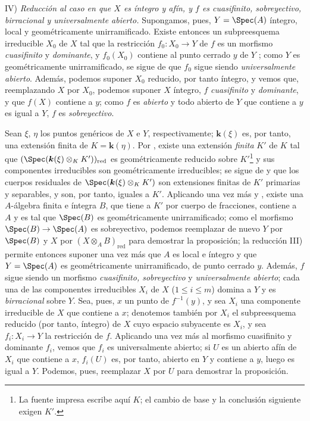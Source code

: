 IV) \emph{Reducción al caso en que $X$ es íntegro y afín, y $f$ es cuasifinito, sobreyectivo, birracional y universalmente abierto.}
Supongamos, pues, $Y=\Spec(A)$ íntegro, local y geométricamente unirramificado.
Existe entonces un subpreesquema irreducible $X_0$ de $X$ tal que la restricción $f_0:X_0\to Y$ de $f$ es un morfismo \emph{cuasifinito} y \emph{dominante}, y $f_0(X_0)$ contiene al punto cerrado $y$ de $Y$ ; como $Y$ es geométricamente unirramificado, se sigue de  que $f_0$ sigue siendo \emph{universalmente abierto}.
Además, podemos suponer $X_0$ reducido, por tanto íntegro, y vemos que, reemplazando $X$ por $X_0$, podemos suponer $X$ íntegro, $f$ \emph{cuasifinito} y \emph{dominante}, y que $f(X)$ contiene a $y$; como $f$ es \emph{abierto} y todo abierto de $Y$ que contiene a $y$ es igual a $Y$, $f$ es \emph{sobreyectivo}.

Sean $\xi$, $\eta$ los puntos genéricos de $X$ e $Y$, respectivamente; $\boldsymbol{k}(\xi)$ es, por tanto, una extensión finita de $K=\boldsymbol{k}(\eta)$.
Por , existe una extensión \emph{finita} $K'$ de $K$ tal que $(\Spec(\boldsymbol{k}(\xi)\otimes_K K'))_{\mathrm{red}}$ es geométricamente reducido sobre $K'$\footnote{La fuente impresa escribe aquí $K$; el cambio de base y la conclusión siguiente exigen $K'$.} y sus componentes irreducibles son geométricamente irreducibles; se sigue de  y  que los cuerpos residuales de $\Spec(\boldsymbol{k}(\xi)\otimes_K K')$ son extensiones finitas de $K'$ primarias y separables, y son, por tanto, iguales a $K'$.
Aplicando una vez más  y , existe una $A$-álgebra finita e íntegra $B$, que tiene a $K'$ por cuerpo de fracciones, contiene a $A$ y es tal que $\Spec(B)$ es geométricamente unirramificado; como el morfismo $\Spec(B)\to\Spec(A)$ es sobreyectivo, podemos reemplazar de nuevo $Y$ por $\Spec(B)$ y $X$ por $(X\otimes_A B)_{\mathrm{red}}$ para demostrar la proposición; la reducción III) permite entonces suponer una vez más que $A$ es local e íntegro y que $Y=\Spec(A)$ es geométricamente unirramificado, de punto cerrado $y$.
Además, $f$ sigue siendo un morfismo \emph{cuasifinito, sobreyectivo} y \emph{universalmente abierto}; cada una de las componentes irreducibles $X_i$ de $X$ ($1\leq i\leq m$) domina a $Y$  y es \emph{birracional} sobre $Y$.
Sea, pues, $x$ un punto de $f^{-1}(y)$, y sea $X_i$ una componente irreducible de $X$ que contiene a $x$; denotemos también por $X_i$ el subpreesquema reducido (por tanto, íntegro) de $X$ cuyo espacio subyacente es $X_i$, y sea $f_i:X_i\to Y$ la restricción de $f$.
Aplicando una vez más  al morfismo cuasifinito y dominante $f_i$, vemos que $f_i$ es universalmente abierto; si $U$ es un abierto afín de $X_i$ que contiene a $x$, $f_i(U)$ es, por tanto,
abierto en $Y$ y contiene a $y$, luego es igual a $Y$.
Podemos, pues, reemplazar $X$ por $U$ para demostrar la proposición.

